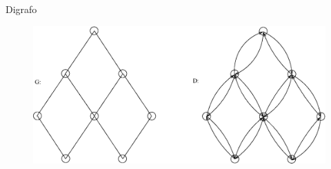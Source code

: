 \documentclass[dvipsnames]{beamer}
\newcommand{\incid}{\mathcal{X}}
\newcommand{\espacoX}{\mathbb{R}^{|E|}}
\newcommand{\spanBridge}{\mathcal{B}}
\newcommand{\BridgeG}{\spanBridge^{t}(G)}
\begin{document}



\begin{frame}{Digrafo}
  \begin{figure}[H]
\centering
%
\includegraphics[scale=0.55]{figures/digrafo_ini.eps}
\label{fig:fig1}
\end{figure}

\end{frame}
\end{document}
